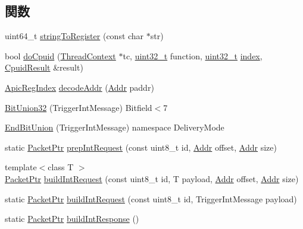 \subsection*{関数}
\begin{DoxyCompactItemize}
\item 
uint64\_\-t \hyperlink{namespaceX86ISA_a50d9573eb56ab6412eb6b6bbba31f440}{stringToRegister} (const char $\ast$str)
\item 
bool \hyperlink{namespaceX86ISA_a1cf7354b42b56aa483040caaa06d7be4}{doCpuid} (\hyperlink{classThreadContext}{ThreadContext} $\ast$tc, \hyperlink{Type_8hh_a435d1572bf3f880d55459d9805097f62}{uint32\_\-t} function, \hyperlink{Type_8hh_a435d1572bf3f880d55459d9805097f62}{uint32\_\-t} \hyperlink{namespaceX86ISA_aa7f971ede8ba06dbd8a605007eda1c6f}{index}, \hyperlink{structX86ISA_1_1CpuidResult}{CpuidResult} \&result)
\item 
\hyperlink{namespaceX86ISA_aaa839fcdf6f426c03c7382fcc29ac649}{ApicRegIndex} \hyperlink{namespaceX86ISA_adb790daea6d2a4198290c636a655fbc7}{decodeAddr} (\hyperlink{base_2types_8hh_af1bb03d6a4ee096394a6749f0a169232}{Addr} paddr)
\item 
\hyperlink{namespaceX86ISA_a178f2c509b14a166e93fd7104d0389b1}{BitUnion32} (TriggerIntMessage) Bitfield$<$7
\item 
\hyperlink{namespaceX86ISA_a476612a8853e8ae8eeb1e409d16d9732}{EndBitUnion} (TriggerIntMessage) namespace DeliveryMode
\item 
static \hyperlink{classPacket}{PacketPtr} \hyperlink{namespaceX86ISA_adda83aa8585dccaf070e3edf66f2b9ab}{prepIntRequest} (const uint8\_\-t id, \hyperlink{base_2types_8hh_af1bb03d6a4ee096394a6749f0a169232}{Addr} offset, \hyperlink{base_2types_8hh_af1bb03d6a4ee096394a6749f0a169232}{Addr} size)
\item 
{\footnotesize template$<$class T $>$ }\\\hyperlink{classPacket}{PacketPtr} \hyperlink{namespaceX86ISA_a46d6b5d34e25b133b7dc83e7c21eb546}{buildIntRequest} (const uint8\_\-t id, T payload, \hyperlink{base_2types_8hh_af1bb03d6a4ee096394a6749f0a169232}{Addr} offset, \hyperlink{base_2types_8hh_af1bb03d6a4ee096394a6749f0a169232}{Addr} size)
\item 
static \hyperlink{classPacket}{PacketPtr} \hyperlink{namespaceX86ISA_a115b5aa6b868f3e950a574ff86996013}{buildIntRequest} (const uint8\_\-t id, TriggerIntMessage payload)
\item 
static \hyperlink{classPacket}{PacketPtr} \hyperlink{namespaceX86ISA_a70003879ed26e8f0387457d00d504b9c}{buildIntResponse} ()

\end{DoxyCompactItemize}

